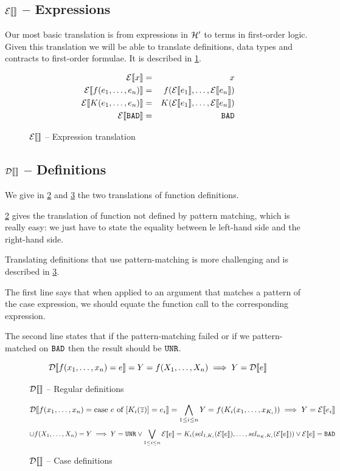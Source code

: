 \documentclass[preprint]{sigplanconf}
\begin{document}
\subsection{$\mathcal{E} \llbracket  \rrbracket$ -- Expressions}
Our most basic translation is from expressions in $\mathcal{H}'$ to terms
in first-order logic. Given this translation we will be able to
translate definitions, data types and contracts to first-order
formulae. It is described in \ref{etrans}.

\begin{figure}
\label{etrans}
\begin{eqnarray*}
  \mathcal{E} \llbracket x \rrbracket &=& x\\
  \mathcal{E} \llbracket f(e_1,\dots,e_n) \rrbracket &=& f(\mathcal{E} \llbracket e_1 \rrbracket,\dots,\mathcal{E} \llbracket e_n \rrbracket)\\
  \mathcal{E} \llbracket K(e_1,\dots,e_n) \rrbracket &=& K(\mathcal{E} \llbracket e_1 \rrbracket,\dots,\mathcal{E} \llbracket e_n \rrbracket)\\
  \mathcal{E} \llbracket \texttt{BAD} \rrbracket &=& \texttt{BAD}
\end{eqnarray*}
\caption{$\mathcal{E} \llbracket  \rrbracket$ -- Expression translation}
\end{figure}

\subsection{$\mathcal{D} \llbracket  \rrbracket$ -- Definitions}
We give in \ref{dtrans-reg} and \ref{dtrans-case} the two translations
of function definitions.

\ref{dtrans-reg} gives the translation of function not defined by
pattern matching, which is really easy: we just have to state the
equality between le left-hand side and the right-hand side.

Translating definitions that use pattern-matching is more challenging
and is described in \ref{dtrans-case}.  

The first line says that when applied to an argument that matches a
pattern of the case expression, we should equate the function call to
the corresponding expression. 

The second line states that if the pattern-matching failed or if we
pattern-matched on $\texttt{BAD}$ then the result should be $\texttt{UNR}$.


\begin{figure}
  \label{dtrans-reg}
  $$\mathcal{D} \llbracket f(x_1,\dots,x_n) = e \rrbracket = Y = f(X_1,\dots,X_n) \implies Y = \mathcal{D} \llbracket e \rrbracket$$
  \caption{$\mathcal{D} \llbracket  \rrbracket$ -- Regular definitions}
\end{figure}


\begin{figure}
  \label{dtrans-case}
  $$ \mathcal{D} \llbracket f(x_1,\dots,x_n) = \mbox{case } e \mbox{ of } [K_i(\overline{z})] = e_i  \rrbracket = \bigwedge_{1 \leq i \leq n} Y = f(K_i(x_1,\dots,x_{K_i})) \implies Y = \mathcal{E} \llbracket e_i \rrbracket $$
  $$ \cup f(X_1,\dots,X_n) = Y \implies Y = \texttt{UNR} \lor \bigvee_{1 \leq i \leq n} \mathcal{E} \llbracket e \rrbracket = K_i(sel_{1,K_i}(\mathcal{E} \llbracket e \rrbracket),\dots,sel_{n_K,K_i}(\mathcal{E} \llbracket e \rrbracket)) \lor \mathcal{E} \llbracket e \rrbracket = \texttt{BAD} $$
  \caption{$\mathcal{D} \llbracket  \rrbracket$ -- Case definitions}
\end{figure}
\end{document}
